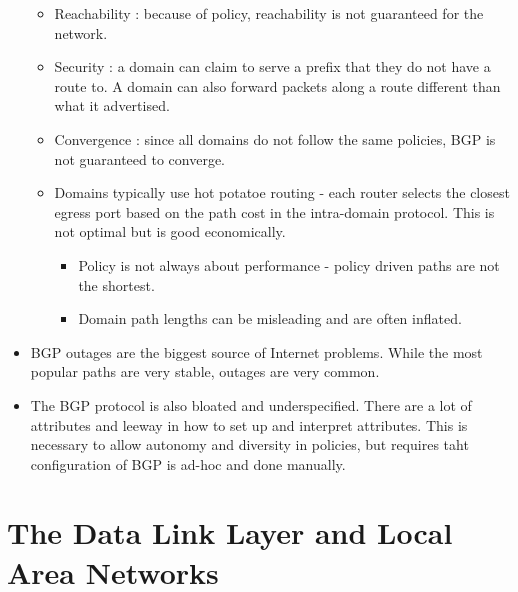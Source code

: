 \begin{itemize}
  \begin{itemize}
  \tightlist
  \item
    Reachability : because of policy, reachability is not guaranteed for
    the network.
  \item
    Security : a domain can claim to serve a prefix that they do not
    have a route to. A domain can also forward packets along a route
    different than what it advertised.
  \item
    Convergence : since all domains do not follow the same policies, BGP
    is not guaranteed to converge.
  \item
    Domains typically use hot potatoe routing - each router selects the
    closest egress port based on the path cost in the intra-domain
    protocol. This is not optimal but is good economically.

    \begin{itemize}
    \tightlist
    \item
      Policy is not always about performance - policy driven paths are
      not the shortest.
    \item
      Domain path lengths can be misleading and are often inflated.
    \end{itemize}
  \end{itemize}
\item
  BGP outages are the biggest source of Internet problems. While the
  most popular paths are very stable, outages are very common.
\item
  The BGP protocol is also bloated and underspecified. There are a lot
  of attributes and leeway in how to set up and interpret attributes.
  This is necessary to allow autonomy and diversity in policies, but
  requires taht configuration of BGP is ad-hoc and done manually.
\end{itemize}

\hypertarget{the-data-link-layer-and-local-area-networks}{%
\section{The Data Link Layer and Local Area
Networks}\label{the-data-link-layer-and-local-area-networks}}

